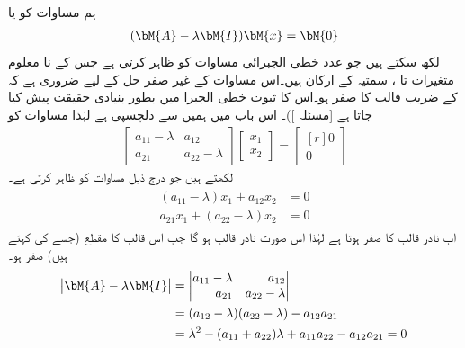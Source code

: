 ہم مساوات  کو  یا 
\begin{align}\label{مساوات_نظام_امتیازی_ب}
(\bM{A}-\lambda \bM{I})\bM{x}=\bM{0}
\end{align}
لکھ سکتے ہیں جو  عدد خطی الجبرائی مساوات کو ظاہر کرتی ہے جس کے نا معلوم متغیرات  تا ، سمتیہ  کے ارکان ہیں۔اس مساوات کے غیر صفر حل  کے لیے ضروری ہے کہ  کے  ضریب  قالب کا  صفر ہو۔اس کا ثبوت  خطی الجبرا میں بطور بنیادی حقیقت پیش کیا جاتا ہے [مسئلہ ])۔ اس باب میں ہمیں   سے دلچسپی ہے لہٰذا مساوات  کو
\begin{align}\label{مساوات_نظام_امتیازی_پ}
\begin{bmatrix*}
a_{11}-\lambda& a_{12}\\
a_{21}& a_{22}-\lambda
\end{bmatrix*}
\begin{bmatrix*}
x_1\\
x_2
\end{bmatrix*}=
\begin{bmatrix*}[r]
0\\
0
\end{bmatrix*}
\end{align}
لکھتے ہیں جو درج ذیل مساوات کو ظاہر کرتی ہے۔
\begin{gather}\label{مساوات_نظام_امتیازی_ت}
\begin{aligned}
(a_{11}-\lambda)x_1+a_{12}x_2&=0\\
a_{21}x_1+(a_{22}-\lambda)x_2&=0
\end{aligned}
\end{gather}
اب نادر قالب کا  صفر ہوتا ہے لہٰذا   اس صورت نادر قالب ہو گا جب اس قالب کا مقطع (جسے  کی  کہتے ہیں) صفر ہو۔
\begin{gather}\label{مساوات_نظام_امتیازی_ٹ}
\begin{aligned}
\abs{\bM{A}-\lambda \bM{I}}&=
\begin{vmatrix*}[r]
a_{11}-\lambda& a_{12}\\
a_{21}& a_{22}-\lambda
\end{vmatrix*}\\
&=(a_{12}-\lambda)(a_{22}-\lambda)-a_{12}a_{21}\\
&=\lambda^2-(a_{11}+a_{22})\lambda+a_{11}a_{22}-a_{12}a_{21}=0
\end{aligned}
\end{gather}
